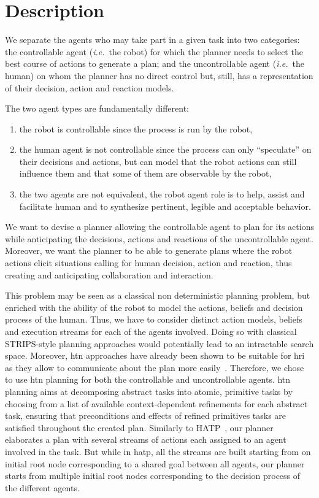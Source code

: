 \documentclass[a4paper,11pt,twoside]{StyleThese}
\begin{document}
\section{Description}
We separate the agents who may take part in a given task into two categories: the controllable agent (\textit{i.e.}~the robot) for which the planner needs to select the best course of actions to generate a plan; and the uncontrollable agent (\textit{i.e.}~the human) on whom the planner has no direct control but, still, has a representation of their decision, action and reaction models.

The two agent types are fundamentally different: 
\begin{enumerate}
\item the robot is controllable since the process is run by the robot,
\item the human agent is not controllable since the process can only ``speculate'' on their decisions and actions, but can model that the robot actions can still influence them and that some of them are observable by the robot,
\item the two agents are not equivalent, the robot agent role is to help, assist and facilitate human and to synthesize pertinent, legible and acceptable behavior.
\end{enumerate}
We want to devise a planner allowing the controllable agent to plan for its actions while anticipating the decisions, actions and reactions of the uncontrollable agent. Moreover, we want the planner to be able to generate plans where the robot actions elicit situations calling for human decision, action and reaction, thus creating and anticipating collaboration and interaction.

\smallskip

This problem may be seen as a classical non deterministic planning problem, but enriched with the ability of the robot to model the actions, beliefs and decision process of the human. Thus, we have to consider distinct action models, beliefs and execution streams for each of the agents involved. Doing so with classical STRIPS-style planning approaches would potentially lead to an intractable search space. Moreover, \acrshort{htn} approaches have already been shown to be suitable for \acrshort{hri} as they allow to communicate about the plan more easily~\cite{lallement2014hatp}. Therefore, we chose to use \acrshort{htn} planning for both the controllable and uncontrollable agents. \acrshort{htn} planning aims at decomposing abstract tasks into atomic, primitive tasks by choosing from a list of available context-dependent refinements for each abstract task, ensuring that preconditions and effects of refined primitives tasks are satisfied throughout the created plan. Similarly to HATP~\cite{sebastiani2017dealing}, our planner elaborates a plan with several streams of actions each assigned to an agent involved in the task. But while in \acrshort{hatp}, all the streams are built starting from on initial root node corresponding to a shared goal between all agents, our planner starts from multiple initial root nodes corresponding to the decision process of the different agents.
\end{document}
